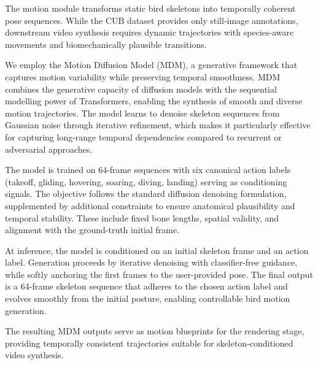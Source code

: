 \documentclass[final-report]{report-template}
\begin{document}



The motion module transforms static bird skeletons into temporally coherent pose sequences. While the CUB dataset provides only still-image annotations, downstream video synthesis requires dynamic trajectories with species-aware movements and biomechanically plausible transitions.  

We employ the Motion Diffusion Model (MDM), a generative framework that captures motion variability while preserving temporal smoothness. MDM combines the generative capacity of diffusion models with the sequential modelling power of Transformers, enabling the synthesis of smooth and diverse motion trajectories. The model learns to denoise skeleton sequences from Gaussian noise through iterative refinement, which makes it particularly effective for capturing long-range temporal dependencies compared to recurrent or adversarial approaches.  

The model is trained on 64-frame sequences with six canonical action labels (takeoff, gliding, hovering, soaring, diving, landing) serving as conditioning signals. The objective follows the standard diffusion denoising formulation, supplemented by additional constraints to ensure anatomical plausibility and temporal stability. These include fixed bone lengths, spatial validity, and alignment with the ground-truth initial frame.  

At inference, the model is conditioned on an initial skeleton frame and an action label. Generation proceeds by iterative denoising with classifier-free guidance, while softly anchoring the first frames to the user-provided pose. The final output is a 64-frame skeleton sequence that adheres to the chosen action label and evolves smoothly from the initial posture, enabling controllable bird motion generation.  

The resulting MDM outputs serve as motion blueprints for the rendering stage, providing temporally consistent trajectories suitable for skeleton-conditioned video synthesis.
\end{document}
